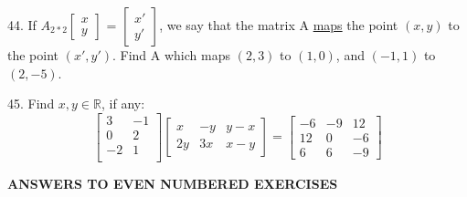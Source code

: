 \documentclass[11pt]{amsbook}
\begin{document}
\begin{enumerate*}

    \item[44.] 
    If $ A_{2*2} 
    \begin{bmatrix}
        x \\
        y
    \end{bmatrix}$
=
    $
    \begin{bmatrix}
        x' \\
        y'
    \end{bmatrix}$,
    we say that the matrix A \underline{maps} the
    point $(x,y)$ to the point $(x',y')$. Find A which maps $(2,3)$
    to $(1,0)$, and $(-1,1)$ to $(2,-5)$.
    
    \medskip
    \item[45.] Find $x, y\in \mathbb{R}$, if any:
    $$
    \begin{bmatrix}
        3 & -1 \\
        0 & 2 \\
        -2 & 1 \\
    \end{bmatrix}
    \begin{bmatrix}
        x & -y & y-x \\
        2y & 3x & x-y
    \end{bmatrix}
    =
    \begin{bmatrix}
        -6 & -9 & 12 \\
        12 & 0 & -6 \\
        6 & 6 & -9
    \end{bmatrix}
    $$
 
\end{enumerate*}
\bigskip
\begin{center}
\textbf{ANSWERS TO EVEN NUMBERED EXERCISES}
\end{center}
\end{document}
